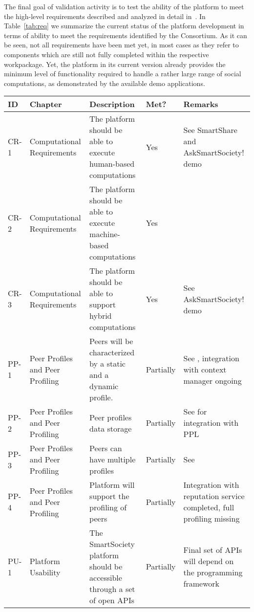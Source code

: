 The final goal of validation activity is to test the ability of the platform to meet the high-level requirements %
described and analyzed in detail in~\cite{D8.1}. In Table~\ref{tab:req} we summarize the current status of the platform development in terms of ability to meet the requirements identified by the Consortium. As it can be seen, not all requirements have been met yet, in most cases as they refer to components which are still not fully completed within the respective workpackage. Yet, the platform in its current version already provides the minimum level of functionality required to handle a rather large range of social computations, as demonstrated by the available demo applications.

\begin{sidewaystable}
{\footnotesize \begin{tabular}{|p{1.1cm}|p{4cm}|p{6.7cm}|p{1.5cm}|p{6.2cm}|}
\hline \hline
ID & Chapter & Description & Met? & Remarks \\
\hline \hline
CR-1 & Computational Requirements & The platform should be able to execute human-based computations & Yes & See SmartShare and AskSmartSociety! demo\\  \hline
CR-2 & Computational Requirements & The platform should be able to execute machine-based computations & Yes & \\ \hline
CR-3 & Computational Requirements & The platform should be able to support hybrid computations & Yes & See AskSmartSociety! demo\\ \hline
PP-1 & Peer Profiles and Peer Profiling & Peers will be characterized by a static and a dynamic profile. & Partially & See \cite{D4.1,D4.2,D4.3}, integration with context manager ongoing\\ \hline
PP-2 & Peer Profiles and Peer Profiling & Peer profiles data storage & Partially & See \cite{D4.3}  for integration with PPL\\ \hline
PP-3 & Peer Profiles and Peer Profiling & Peers can have multiple profiles & Partially & See \cite{D4.2,D4.3}\\ \hline
PP-4 &Peer Profiles and Peer Profiling  & Platform will support the profiling of peers & Partially & Integration with reputation service completed, full profiling missing\\ \hline
PU-1 & Platform Usability & The SmartSociety platform should be accessible through a set of open APIs & Partially & Final set of APIs will depend on the programming framework~\cite{D7.2} \\ \hline

\end{tabular}}
\end{sidewaystable}
